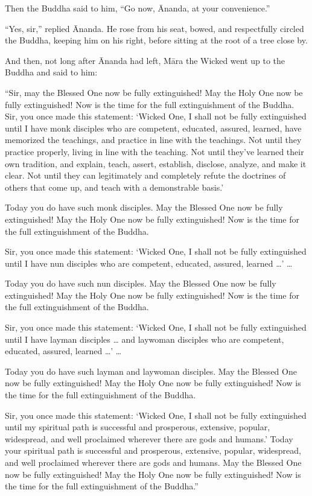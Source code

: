\documentclass[12pt,openany]{book}%
\begin{document}
Then the Buddha said to him, “Go now, Ānanda, at your convenience.” 

“Yes, sir,” replied Ānanda. He rose from his seat, bowed, and respectfully circled the Buddha, keeping him on his right, before sitting at the root of a tree close by. 

And then, not long after Ānanda had left, \textsanskrit{Māra} the Wicked went up to the Buddha and said to him: 

“Sir, may the Blessed One now be fully extinguished! May the Holy One now be fully extinguished! Now is the time for the full extinguishment of the Buddha. Sir, you once made this statement: ‘Wicked One, I shall not be fully extinguished until I have monk disciples who are competent, educated, assured, learned, have memorized the teachings, and practice in line with the teachings. Not until they practice properly, living in line with the teaching. Not until they’ve learned their own tradition, and explain, teach, assert, establish, disclose, analyze, and make it clear. Not until they can legitimately and completely refute the doctrines of others that come up, and teach with a demonstrable basis.’ 

Today you do have such monk disciples. May the Blessed One now be fully extinguished! May the Holy One now be fully extinguished! Now is the time for the full extinguishment of the Buddha. 

Sir, you once made this statement: ‘Wicked One, I shall not be fully extinguished until I have nun disciples who are competent, educated, assured, learned …’ … 

Today you do have such nun disciples. May the Blessed One now be fully extinguished! May the Holy One now be fully extinguished! Now is the time for the full extinguishment of the Buddha. 

Sir, you once made this statement: ‘Wicked One, I shall not be fully extinguished until I have layman disciples … and laywoman disciples who are competent, educated, assured, learned …’ … 

Today you do have such layman and laywoman disciples. May the Blessed One now be fully extinguished! May the Holy One now be fully extinguished! Now is the time for the full extinguishment of the Buddha. 

Sir, you once made this statement: ‘Wicked One, I shall not be fully extinguished until my spiritual path is successful and prosperous, extensive, popular, widespread, and well proclaimed wherever there are gods and humans.’ Today your spiritual path is successful and prosperous, extensive, popular, widespread, and well proclaimed wherever there are gods and humans. May the Blessed One now be fully extinguished! May the Holy One now be fully extinguished! Now is the time for the full extinguishment of the Buddha.” 
\end{document}
